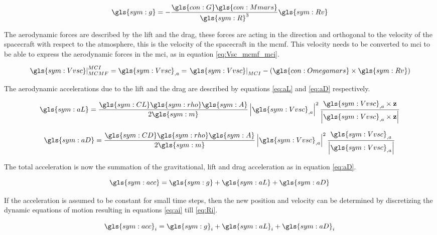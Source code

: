 \begin{equation} \label{eq:nG}
\gls{sym:g} = -\frac{\gls{con:G}\gls{con:Mmars}}
					{\gls{sym:R}^3}\gls{sym:Rv}
\end{equation}

The aerodynamic forces are described by the lift and the drag, these forces are acting in the direction and orthogonal to the velocity of the spacecraft with respect to the atmosphere, this is the velocity of the spacecraft in the \gls{mcmf}. This velocity needs to be converted to \gls{mci} to be able to express the aerodynamic forces in the \gls{mci}, as in equation \ref{eq:Vsc_mcmf_mci}.

\begin{equation} \label{eq:Vsc_mcmf_mci}
\left.\gls{sym:Vvsc}\right|_{MCMF}^{MCI} = \gls{sym:Vvsc}_{,a} = \left.\gls{sym:Vvsc}\right|_{MCI} - \left(\gls{con:Omegamars} \times \gls{sym:Rv} \right)
\end{equation}

The aerodynamic accelerations due to the lift and the drag are described by equations \ref{eq:aL} and \ref{eq:aD} respectively.

\begin{equation} \label{eq:aL}
\gls{sym:aL} = \frac{\gls{sym:CL}\gls{sym:rho}\gls{sym:A}}{2 \gls{sym:m}} 
				\left|\gls{sym:Vvsc}_{,a}\right|^2
				\frac{\gls{sym:Vvsc}_{,a} \times \mathbf{z}}
				{\left| \gls{sym:Vvsc}_{,a} \times \mathbf{z}\right|}
\end{equation}

\begin{equation} \label{eq:aD}
\gls{sym:aD} = \frac{\gls{sym:CD}\gls{sym:rho}\gls{sym:A}}{2 \gls{sym:m}}
				\left|\gls{sym:Vvsc}_{,a}\right|^2 \frac{\gls{sym:Vvsc}_{,a}}{\left|\gls{sym:Vvsc}_{,a}\right|}
\end{equation}

The total acceleration is now the summation of the gravitational, lift and drag acceleration as in equation \ref{eq:aD}.

\begin{equation} \label{eq:acc}
\gls{sym:acc} = \gls{sym:g} + \gls{sym:aL} + \gls{sym:aD}
\end{equation}

If the acceleration is assumed to be constant for small time steps, then the new position and velocity can be determined by discretizing the dynamic equations of motion resulting in equations \ref{eq:ai} till \ref{eq:Ri}.

\begin{equation} \label{eq:ai}
\gls{sym:acc}_i = \gls{sym:g}_i + \gls{sym:aL}_i + \gls{sym:aD}_i
\end{equation}

